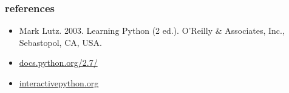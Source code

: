 \documentclass{beamer}
\begin{document}


\begin{frame}
 \frametitle{references}
 \begin{itemize}
  \item Mark Lutz. 2003. Learning Python (2 ed.). O'Reilly \& Associates, Inc., Sebastopol, CA, USA.
  \item \href{https://docs.python.org/2.7/}{docs.python.org/2.7/}
  \item \href{http://interactivepython.org}{interactivepython.org}
 \end{itemize}
\end{frame}
\end{document}
